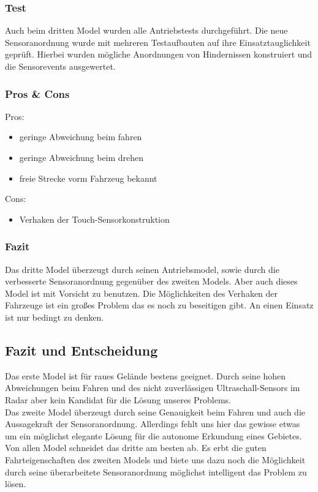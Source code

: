 \documentclass[10pt,a4paper]{scrartcl}
\begin{document}
\subsubsection{Test}
Auch beim dritten Model wurden alle Antriebstests durchgeführt. Die neue Sensoranordnung wurde mit mehreren Testaufbauten auf ihre Einsatztauglichkeit geprüft. Hierbei wurden mögliche Anordnungen von Hindernissen konstruiert und die Sensorevents ausgewertet.
\subsubsection{Pros \& Cons}
Pros:
\begin{itemize}
\item geringe Abweichung beim fahren
\item geringe Abweichung beim drehen
\item freie Strecke vorm Fahrzeug bekannt
\end{itemize}
Cons:
\begin{itemize}
\item Verhaken der Touch-Sensorkonstruktion
\end{itemize}
\subsubsection{Fazit}
Das dritte Model überzeugt durch seinen Antriebsmodel, sowie durch die verbesserte Sensoranordnung gegenüber des zweiten Models. Aber auch dieses Model ist mit Vorsicht zu benutzen. Die Möglichkeiten des Verhaken der Fahrzeuge ist ein großes Problem das es noch zu beseitigen gibt. An einen Einsatz ist nur bedingt zu denken.
\subsection{Fazit und Entscheidung}
Das erste Model ist für raues Gelände bestens geeignet. Durch seine hohen Abweichungen beim Fahren und des nicht zuverlässigen Ultraschall-Sensors im Radar aber kein Kandidat für die Lösung unseres Problems.\\
Das zweite Model überzeugt durch seine Genauigkeit beim Fahren und auch die Aussagekraft der Sensoranordnung. Allerdings fehlt uns hier das gewisse etwas um ein möglichst elegante Lösung für die autonome Erkundung eines Gebietes.\\
Von allen Model schneidet das dritte am besten ab. Es erbt die guten Fahrteigenschaften des zweiten Models und biete uns dazu noch die Möglichkeit durch seine überarbeitete Sensoranordnung möglichst intelligent das Problem zu lösen. 
\end{document}

